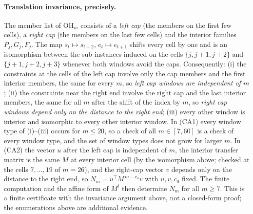 \paragraph{Translation invariance, precisely.} The member list of $\mathrm{OH}_m$ consists of a \emph{left cap} (the members on the first few cells), a \emph{right cap} (the members on the last few cells) and the interior families $P_j,G_j,F_j$. The map $s_t\mapsto s_{t+2}$, $e_t\mapsto e_{t+1}$ shifts every cell by one and is an isomorphism between the sub-instances induced on the cells $\{j,j+1,j+2\}$ and $\{j+1,j+2,j+3\}$ whenever both windows avoid the caps. Consequently: (i) the constraints at the cells of the left cap involve only the cap members and the first interior members, the same for every $m$, so \emph{left cap windows are independent of $m$}; (ii) the constraints near the right end involve the right cap and the last interior members, the same for all $m$ after the shift of the index by $m$, so \emph{right cap windows depend only on the distance to the right end}; (iii) every other window is interior and isomorphic to every other interior window. In (CA1) every window type of (i)--(iii) occurs for $m\le20$, so a check of all $m\in[7,60]$ is a check of every window type, and the set of window types does not grow for larger $m$. In (CA2) the vector $u$ after the left cap is independent of $m$, the interior transfer matrix is the same $M$ at every interior cell (by the isomorphism above; checked at the cells $7,\dots,19$ of $m=26$), and the right-cap vector $v$ depends only on the distance to the right end, so $N_m=u^{\top}M^{\,m-c_0}v$ with $u,v,c_0$ fixed. The finite computation and the affine form of $M^t$ then determine $N_m$ for all $m\ge7$. This is a finite certificate with the invariance argument above, not a closed-form proof; the enumerations above are additional evidence.

